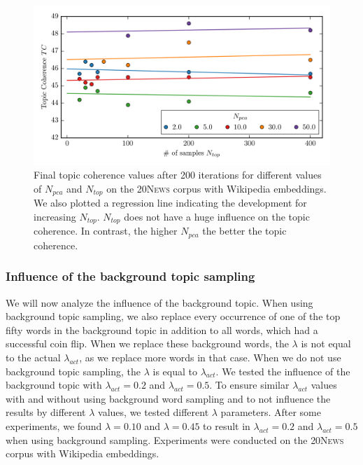 \documentclass[
        a4paper,
        titlepage,
        twoside,
        parskip,
        numbers=noenddot
        ]{scrbook}
\theoremstyle{break}
\begin{document}
\begin{figure}
       \centering
       \includegraphics[width=\textwidth]{figures/welda_gaussian_pca_samples.png}
       \caption{Final topic coherence values after 200 iterations for different values of $N_{pca}$ and $N_{top}$ on the \textsc{20News} corpus with Wikipedia embeddings. We also plotted a regression line indicating the development for increasing $N_{top}$. $N_{top}$ does not have a huge influence on the topic coherence. In contrast, the higher $N_{pca}$ the better the topic coherence.}
       \label{fig:welda_gaussian_pca_samples}
\end{figure}


\subsubsection{Influence of the background topic sampling}

We will now analyze the influence of the background topic.
When using background topic sampling, we also replace every occurrence of one of the top fifty words in the background topic in addition to all words, which had a successful coin flip.
When we replace these background words, the $\lambda$ is not equal to the actual $\lambda_{act}$, as we replace more words in that case.
When we do not use background topic sampling, the $\lambda$ is equal to $\lambda_{act}$.
We tested the influence of the background topic with $\lambda_{act} = 0.2$ and $\lambda_{act} = 0.5$.
To ensure similar $\lambda_{act}$ values with and without using background word sampling and to not influence the results by different $\lambda$ values, we tested different $\lambda$ parameters.
After some experiments, we found $\lambda = 0.10$ and $\lambda = 0.45$ to result in $\lambda_{act} = 0.2$ and $\lambda_{act} = 0.5$ when using background sampling.
Experiments were conducted on the \textsc{20News} corpus with Wikipedia embeddings.
\end{document}
